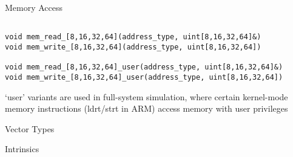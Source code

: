\begin{frame}[fragile]{Memory Access}

\begin{lstlisting}

void mem_read_[8,16,32,64](address_type, uint[8,16,32,64]&)
void mem_write_[8,16,32,64](address_type, uint[8,16,32,64])

void mem_read_[8,16,32,64]_user(address_type, uint[8,16,32,64]&)
void mem_write_[8,16,32,64]_user(address_type, uint[8,16,32,64])

\end{lstlisting}

`user' variants are used in full-system simulation, where certain 
kernel-mode memory instructions (ldrt/strt in ARM) access memory with
user privileges

\end{frame}

\begin{frame}{Vector Types}

\end{frame}

\begin{frame}{Intrinsics}

\end{frame}
